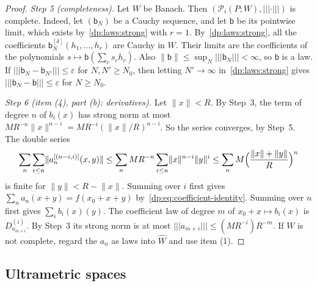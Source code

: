 \documentclass[11pt]{amsart}
\theoremstyle{definition}
\theoremstyle{remark}
\numberwithin{equation}{section}
\newcommand{\norm}[1]{\lVert #1\rVert}
\theoremstyle{plain}
\theoremstyle{definition}
\theoremstyle{plain}
\newcommand{\cP}{\mathcal P}
\begin{document}
\begin{proof}
\emph{Step 5 (completeness).} Let $W$ be Banach. Then $(\cP_i(P;W),\lvert\!\lvert\!\lvert\cdot\rvert\!\rvert\!\rvert)$ is complete. Indeed, let $(\mathsf b_N)$ be a Cauchy sequence, and let $\mathsf b$ be its pointwise limit, which exists by~\eqref{dp:laws:strong} with $r=1$. By~\eqref{dp:laws:strong}, all the coefficients $\mathsf b_N^{[\delta]}(h_1,\dots,h_r)$ are Cauchy in $W$. Their limits are the coefficients of the polynomials $s\mapsto\mathsf b(\sum_cs_ch_c)$. Also $\norm{\mathsf b}\le\sup_N\lvert\!\lvert\!\lvert\mathsf b_N\rvert\!\rvert\!\rvert<\infty$, so $\mathsf b$ is a law. If $\lvert\!\lvert\!\lvert\mathsf b_N-\mathsf b_{N'}\rvert\!\rvert\!\rvert\le\varepsilon$ for $N,N'\ge N_0$, then letting $N'\to\infty$ in~\eqref{dp:laws:strong} gives $\lvert\!\lvert\!\lvert\mathsf b_N-\mathsf b\rvert\!\rvert\!\rvert\le\varepsilon$ for $N\ge N_0$.

\emph{Step 6 (item (4), part (b): derivatives).} Let $\norm x<R$. By Step~3, the term of degree $n$ of $b_i(x)$ has strong norm at most $MR^{-n}\norm x^{n-i}=MR^{-i}(\norm x/R)^{n-i}$. So the series converges, by Step~5. The double series
\[
 \sum_n\sum_{i\le n}\norm{a_n^{[(n-i,i)]}(x,y)}\le\sum_nMR^{-n}\sum_{i\le n}\norm x^{n-i}\norm y^i\le\sum_nM\Bigl(\frac{\norm x+\norm y}R\Bigr)^n
\]
is finite for $\norm y<R-\norm x$. Summing over $i$ first gives $\sum_na_n(x+y)=f(x_0+x+y)$ by~\eqref{dp:eq:coefficient-identity}. Summing over $n$ first gives $\sum_ib_i(x)(y)$. The coefficient law of degree $m$ of $x_0+x\mapsto b_i(x)$ is $D^{(i)}_{a_{m+i}}$. By Step~3 its strong norm is at most $\lvert\!\lvert\!\lvert a_{m+i}\rvert\!\rvert\!\rvert\le(MR^{-i})R^{-m}$. If $W$ is not complete, regard the $a_n$ as laws into $\widehat W$ and use item (1).
\end{proof}

\subsection{Ultrametric spaces}
\end{document}
